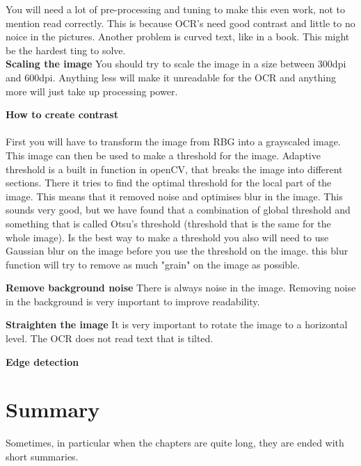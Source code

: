 You will need a lot of pre-processing and tuning to make this even work, not to mention read correctly.
This is because OCR's need good contrast and little to no noice in the pictures.
Another problem is curved text, like in a book.
This might be the hardest ting to solve.
\\
\textbf{Scaling the image}
You should try to scale the image in a size between 300dpi and 600dpi.
Anything less will make it unreadable for the OCR and anything more will just take up processing power.

\textbf{How to create contrast}
\\\\

First you will have to transform the image from RBG into a grayscaled image.
This image can then be used to make a threshold for the image.
Adaptive threshold is a built in function in openCV, that breaks the image into different sections.
There it tries to find the optimal threshold for the local part of the image.
This means that it removed noise and optimises blur in the image.
This sounds very good, but we have found that a combination of global threshold and something that is called Otsu's threshold (threshold that is the same for the whole image).
Is the best way to make a threshold you also will need to use Gaussian blur on the image before you use the threshold on the image.
this blur function will try to remove as much "grain" on the image as possible.

\textbf{Remove background noise}
There is always noise in the image.
Removing noise in the background is very important to improve readability.

\textbf{Straighten the image}
It is very important to rotate the image to a horizontal level.
The OCR does not read text that is tilted.

\textbf{Edge detection}



\section{Summary}\label{sec:summary}

Sometimes, in particular when the chapters are quite long, they are ended with short summaries.
